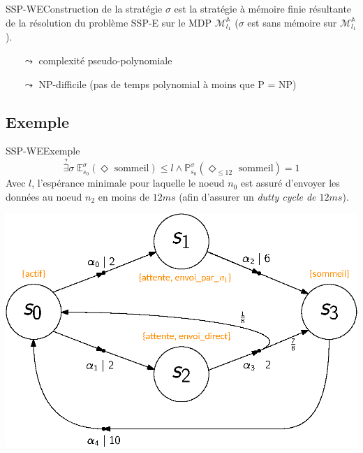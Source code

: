\documentclass[compress]{beamer}
\theoremstyle{theorem}%
\begin{document}
\begin{frame}{SSP-WE}{Construction de la stratégie}
  $\sigma$ est la stratégie à mémoire finie résultante de la résolution du problème SSP-E sur le MDP $\mathcal{M}_{l_1}^\mathbb{A}$ ($\sigma$ est sans mémoire sur $\mathcal{M}_{l_1}^\mathbb{A}$).
  \begin{itemize}
    \item[$\leadsto$] complexité pseudo-polynomiale
    \item[$\leadsto$] NP-difficile (pas de temps polynomial à moins que P = NP)
  \end{itemize}
\end{frame}

\subsection{Exemple}
\begin{frame}{SSP-WE}{Exemple}
    \[ \overset{?}{\exists} \sigma \; \mathbb{E}^{\sigma}_{s_0}(\Diamond \text{ sommeil}) \leq l \wedge \mathbb{P}^\sigma_{s_0}(\Diamond_{\leq 12} \text{ sommeil}) = 1 \]
    {\footnotesize Avec $l$, l'espérance minimale pour laquelle le noeud $n_0$ est assuré d'envoyer les données au noeud $n_2$ en moins de $12 ms$ (afin d'assurer un \textit{dutty cycle de $12 ms$}).}
    \begin{center}
      \includegraphics[width=0.6\linewidth]{resources/main-mdp3}
    \end{center}
\end{frame}
\end{document}
